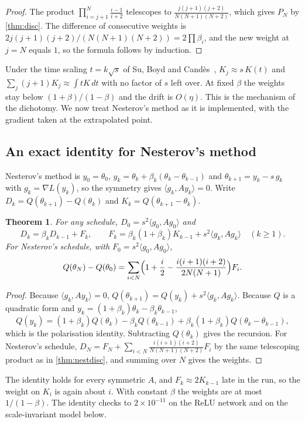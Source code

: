 \documentclass[11pt]{article}
\newtheorem{theorem}{Theorem}
\theoremstyle{remark}
\theoremstyle{definition}
\newcommand{\ip}[2]{\langle #1,#2\rangle}
\begin{document}
\begin{proof}
The product $\prod_{i=j+1}^N\frac{i-1}{i+2}$ telescopes to $\frac{j(j+1)(j+2)}{N(N+1)(N+2)}$, which gives $P_N$ by \cref{thm:disc}. The difference of consecutive weights is $2j(j+1)(j+2)/(N(N+1)(N+2))=2\prod\beta_i$, and the new weight at $j=N$ equals $1$, so the formula follows by induction.
\end{proof}

Under the time scaling $t=k\sqrt s$ of Su, Boyd and Cand\`es~\cite{su2016}, $K_j\approx s\,K(t)$ and $\sum_j(j+1)K_j\approx\int tK\,dt$ with no factor of $s$ left over. At fixed $\beta$ the weights stay below $(1+\beta)/(1-\beta)$ and the drift is $O(\eta)$. This is the mechanism of the dichotomy. We now treat Nesterov's method as it is implemented, with the gradient taken at the extrapolated point.

\subsection{An exact identity for Nesterov's method}

Nesterov's method is $y_0=\theta_0$, $y_k=\theta_k+\beta_k(\theta_k-\theta_{k-1})$ and $\theta_{k+1}=y_k-s\,g_k$ with $g_k=\nabla L(y_k)$, so the symmetry gives $\ip{g_k}{Ay_k}=0$. Write $D_k=Q(\theta_{k+1})-Q(\theta_k)$ and $K_k=Q(\theta_{k+1}-\theta_k)$.

\begin{theorem}\label{thm:nag}
For any schedule, $D_0=s^2\ip{g_0}{Ag_0}$ and
\[
D_k=\beta_kD_{k-1}+F_k,\qquad F_k=\beta_k(1+\beta_k)K_{k-1}+s^2\ip{g_k}{Ag_k}\quad(k\ge1).
\]
For Nesterov's schedule, with $F_0=s^2\ip{g_0}{Ag_0}$,
\[
Q(\theta_N)-Q(\theta_0)=\sum_{i<N}\Bigl(1+\frac i2-\frac{i(i+1)(i+2)}{2N(N+1)}\Bigr)F_i .
\]
\end{theorem}

\begin{proof}
Because $\ip{g_k}{Ay_k}=0$, $Q(\theta_{k+1})=Q(y_k)+s^2\ip{g_k}{Ag_k}$. Because $Q$ is a quadratic form and $y_k=(1+\beta_k)\theta_k-\beta_k\theta_{k-1}$,
\[
Q(y_k)=(1+\beta_k)Q(\theta_k)-\beta_kQ(\theta_{k-1})+\beta_k(1+\beta_k)Q(\theta_k-\theta_{k-1}),
\]
which is the polarisation identity. Subtracting $Q(\theta_k)$ gives the recursion. For Nesterov's schedule, $D_N=F_N+\sum_{i<N}\frac{i(i+1)(i+2)}{N(N+1)(N+2)}F_i$ by the same telescoping product as in \cref{thm:nestdisc}, and summing over $N$ gives the weights.
\end{proof}

The identity holds for every symmetric $A$, and $F_k\approx2K_{k-1}$ late in the run, so the weight on $K_i$ is again about $i$. With constant $\beta$ the weights are at most $1/(1-\beta)$. The identity checks to $2\times10^{-11}$ on the ReLU network and on the scale-invariant model below.
\end{document}
